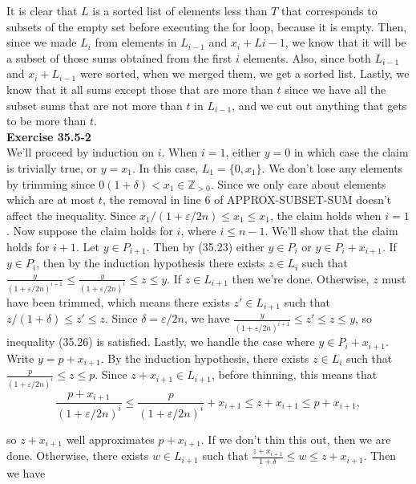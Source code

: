 \documentclass{article}
\begin{document}
It is clear that $L$ is a sorted list of elements less than $T$ that corresponds to subsets of the empty set before executing the for loop, because it is empty. Then, since we made $L_i$ from elements in $L_{i-1}$ and $x_i + L{i-1}$, we know that it will be a subset of those sums obtained from the first $i$ elements. Also, since both $L_{i-1}$ and $x_i + L_{i-1}$ were sorted, when we merged them, we get a sorted list. Lastly, we know that it all sums except those that are more than $t$ since we have all the subset sums that are not more than $t$ in $L_{i-1}$, and we cut out anything that gets to be more than $t$.\\

\noindent\textbf{Exercise 35.5-2}\\

We'll proceed by induction on $i$.  When $i=1$, either $y=0$ in which case the claim is trivially true, or $y=x_1$.  In this case, $L_1 = \{0,x_1\}$.  We don't lose any elements by trimming since $0(1+\delta) < x_1 \in \mathbb{Z}_{>0}$.  Since we only care about elements which are at most $t$, the removal in line 6 of APPROX-SUBSET-SUM doesn't affect the inequality.  Since $x_1/(1+\varepsilon/2n) \leq x_1 \leq x_1$, the claim holds when $i=1$.  Now suppose the claim holds for $i$, where $i \leq n-1$.  We'll show that the claim holds for $i+1$. Let $y \in P_{i+1}$.  Then by (35.23) either $y \in P_i$ or $y \in P_i + x_{i+1}$.  If $y \in P_i$, then by the induction hypothesis there exists $z \in L_i$ such that $\frac{y}{(1+\varepsilon/2n)^{i+1}} \leq\frac{y}{(1+\varepsilon/2n)^i} \leq z \leq y$. If $z \in L_{i+1}$ then we're done.  Otherwise, $z$ must have been trimmed, which means there exists $z' \in L_{i+1}$ such that $z/(1+\delta) \leq z' \leq z$.  Since $\delta = \varepsilon/2n$, we have $\frac{y}{(1+\varepsilon/2n)^{i+1}} \leq z' \leq z \leq y$, so inequality (35.26) is satisfied.  Lastly, we handle the case where $y \in P_i + x_{i+1}$.  Write $y = p + x_{i+1}$.  By the induction hypothesis, there exists $z \in L_i$ such that $\frac{p}{(1+\varepsilon/2n)^i} \leq z \leq p$.  Since $z + x_{i+1} \in L_{i+1}$, before thinning, this means that
\[ \frac{p + x_{i+1}}{(1+\varepsilon/2n)^i} \leq \frac{p}{(1+\varepsilon/2n)^i} + x_{i+1} \leq z + x_{i+1} \leq p + x_{i+1},\]

so $z + x_{i+1}$ well approximates $p + x_{i+1}$.  If we don't thin this out, then we are done.  Otherwise, there exists $w \in L_{i+1}$ such that $\frac{z+x_{i+1}}{1 + \delta} \leq w \leq z + x_{i+1}$. Then we have
\end{document}
